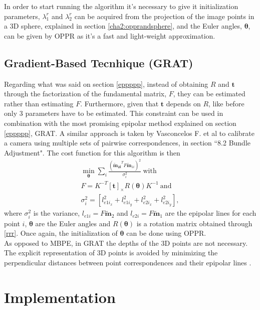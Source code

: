 In order to start running the algorithm it's necessary to give it initialization parameters, $\lambda_{1}^r$ and $\lambda_{2}^r$ can be acquired from the projection of the image points in a 3D sphere, explained in section \ref{cha2:opprandsphere}, and the Euler angles, $\mathbf{\theta}$, can be given by OPPR as it's a fast and light-weight approximation.

\subsection{Gradient-Based Tecnhique (GRAT)}
\label{fjeopfe}
Regarding what was said on section \ref{eppppp}, instead of obtaining $R$ and $\mathbf{t}$ through the factorization of the fundamental matrix, $F$, they can be estimated rather than estimating $F$. Furthermore, given that $\mathbf{t}$ depends on $R$, like before only 3 parameters have to be estimated. 
This constraint can be used in combination with the most promising epipolar method explained on section \ref{eppppp}, GRAT. A similar approach is taken by Vasconcelos F. et al \cite{vasconcelos}
to calibrate a camera using multiple sets of pairwise correspondences, in section ``8.2 Bundle Adjustment". 
The cost function for this algorithm is then
\begin{align}
\min_\mathbf{\theta} \sum_i \frac{ (\mathbf{\widetilde{\mathbf{m}}_{2i}}^T F \widetilde{\mathbf{m}}_{1i})^2}{\sigma_i^2} \ \text{with}\\
F = K^{-T} [\mathbf{t}]_\times R(\mathbf{ \theta}) K^{-1} \ \text{and}\\
\label{dopewnrvno}
\sigma_i^2 =  [l_{{e1i}_x}^2 + l_{{e1i}_y}^2 + l_{{e2i}_x}^2 + l_{{e2i}_y}^2],
\end{align}
where $\sigma_i^2$ is the variance, $l_{e1i} = F\widetilde{\mathbf{m}}_{2}$ and $l_{e2i} = F\widetilde{\mathbf{m}}_{1}$ are the epipolar lines for each point $i$, $\mathbf{\theta}$ are the Euler angles and $R(\mathbf{ \theta})$ is a rotation matrix obtained through \ref{rrr}. Once again, the initialization of $\mathbf{ \theta}$ can be done using OPPR.\\

As opposed to MBPE, in GRAT the depths of the 3D points are not necessary. The explicit representation of 3D points is avoided by minimizing the perpendicular distances between point correspondences and their epipolar lines \cite{vasconcelos} \cite{bundle}.

\section{Implementation}
\label{chapter:implementation}

